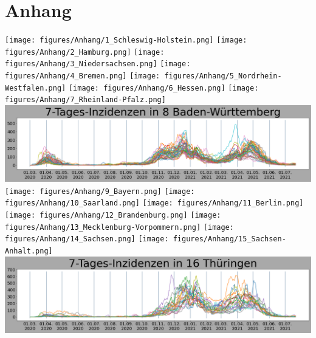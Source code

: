 \chapter{Anhang}\label{Anhang}
\texttt{[image: figures/Anhang/1\_Schleswig-Holstein.png]}
\texttt{[image: figures/Anhang/2\_Hamburg.png]}
\texttt{[image: figures/Anhang/3\_Niedersachsen.png]}
\texttt{[image: figures/Anhang/4\_Bremen.png]}
\texttt{[image: figures/Anhang/5\_Nordrhein-Westfalen.png]}
\texttt{[image: figures/Anhang/6\_Hessen.png]}
\texttt{[image: figures/Anhang/7\_Rheinland-Pfalz.png]}
\includegraphics[width=\textwidth]{figures/Anhang/8_Baden-Württemberg.png}
\texttt{[image: figures/Anhang/9\_Bayern.png]}
\texttt{[image: figures/Anhang/10\_Saarland.png]}
\texttt{[image: figures/Anhang/11\_Berlin.png]}
\texttt{[image: figures/Anhang/12\_Brandenburg.png]}
\texttt{[image: figures/Anhang/13\_Mecklenburg-Vorpommern.png]}
\texttt{[image: figures/Anhang/14\_Sachsen.png]}
\texttt{[image: figures/Anhang/15\_Sachsen-Anhalt.png]}
\includegraphics[width=\textwidth]{figures/Anhang/16_Thüringen.png}
